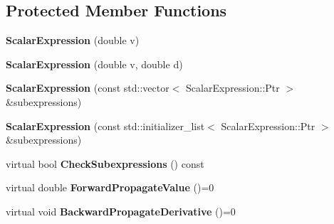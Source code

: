 \subsection*{Protected Member Functions}
\begin{DoxyCompactItemize}
\item 
\hypertarget{classautodifk_1_1reverse_1_1_scalar_expression_a7712b3a11b23ae7c082204efbe9b1715}{{\bfseries Scalar\-Expression} (double v)}\label{classautodifk_1_1reverse_1_1_scalar_expression_a7712b3a11b23ae7c082204efbe9b1715}

\item 
\hypertarget{classautodifk_1_1reverse_1_1_scalar_expression_ac4954f13405d688c716d7bb79537e86f}{{\bfseries Scalar\-Expression} (double v, double d)}\label{classautodifk_1_1reverse_1_1_scalar_expression_ac4954f13405d688c716d7bb79537e86f}

\item 
\hypertarget{classautodifk_1_1reverse_1_1_scalar_expression_a80fb01a8e7e88503dd543fc3ac5b3939}{{\bfseries Scalar\-Expression} (const std\-::vector$<$ Scalar\-Expression\-::\-Ptr $>$ \&subexpressions)}\label{classautodifk_1_1reverse_1_1_scalar_expression_a80fb01a8e7e88503dd543fc3ac5b3939}

\item 
\hypertarget{classautodifk_1_1reverse_1_1_scalar_expression_a86a8f5a65b0d6bb0f0ef0a48dab651eb}{{\bfseries Scalar\-Expression} (const std\-::initializer\-\_\-list$<$ Scalar\-Expression\-::\-Ptr $>$ \&subexpressions)}\label{classautodifk_1_1reverse_1_1_scalar_expression_a86a8f5a65b0d6bb0f0ef0a48dab651eb}

\item 
\hypertarget{classautodifk_1_1reverse_1_1_scalar_expression_a7cf1b9db84a62e39294c19fab45958ef}{virtual bool {\bfseries Check\-Subexpressions} () const }\label{classautodifk_1_1reverse_1_1_scalar_expression_a7cf1b9db84a62e39294c19fab45958ef}

\item 
\hypertarget{classautodifk_1_1reverse_1_1_scalar_expression_a358b7c4f8e2425d0e11c0e37c06ff665}{virtual double {\bfseries Forward\-Propagate\-Value} ()=0}\label{classautodifk_1_1reverse_1_1_scalar_expression_a358b7c4f8e2425d0e11c0e37c06ff665}

\item 
\hypertarget{classautodifk_1_1reverse_1_1_scalar_expression_aa25dc105d7ef6eb766383b5b0973957b}{virtual void {\bfseries Backward\-Propagate\-Derivative} ()=0}\label{classautodifk_1_1reverse_1_1_scalar_expression_aa25dc105d7ef6eb766383b5b0973957b}

\end{DoxyCompactItemize}
